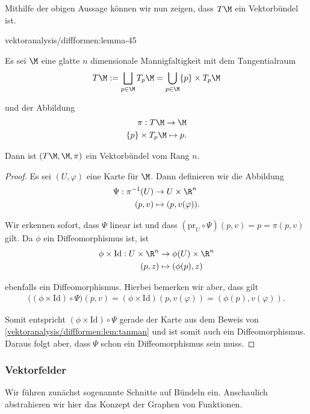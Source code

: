 \documentclass[letterpaper,10pt,english]{jupyterBook}
\begin{document}
\par
Mithilfe der obigen Aussage können wir nun zeigen, dass \(T\M\) ein Vektorbündel ist.
\begin{lemma}{}{vektoranalysis/diffformen:lemma-45}



\par
Es sei \(\M\) eine glatte \(n\) dimensionale Mannigfaltigkeit mit dem Tangentialraum
\begin{align*}
T\M:= \bigsqcup_{p\in\M}  T_p\M = \bigcup_{p\in\M} \{p\} \times T_p\M
\end{align*}
\par
und der Abbildung
\begin{align*}
\pi:T\M\to \M\\
\{p\}\times T_p\M\mapsto p.
\end{align*}
\par
Dann ist \((T\M, \M, \pi)\) ein Vektorbündel vom Rang \(n\).
\end{lemma}

\begin{proof}
 Es sei \((U,\varphi)\) eine Karte für \(\M\).
Dann definieren wir die Abbildung
\begin{align*}
\Psi: \pi^{-1}(U) &\to U\times \R^n\\
(p,v) &\mapsto (p, v(\varphi)).
\end{align*}
\par
Wir erkennen sofort, dass \(\Psi\) linear ist und dass \((\text{pr}_U\circ\Psi)(p,v) = p = \pi(p,v)\) gilt.
Da \(\phi\) ein Diffeomorphismus ist, ist
\begin{align*}
\phi\times\text{Id}:U\times \R^n &\to \phi(U)\times\R^n\\
(p,z) &\mapsto (\phi(p), z)
\end{align*}
\par
ebenfalls ein Diffeomorphismus.
Hierbei bemerken wir aber, dass gilt
\begin{align*}
\big((\phi\times\text{Id})\circ \Psi\big)(p,v) = (\phi\times\text{Id})(p, v(\varphi)) = (\phi(p), v(\varphi)).
\end{align*}
\par
Somit entspricht \((\phi\times\text{Id})\circ \Psi\) gerade der Karte aus dem Beweis von \cref{vektoranalysis/diffformen:lem:tanman} und ist somit auch ein Diffeomorphismus.
Daraus folgt aber, dass \(\Psi\) schon ein Diffeomorphismus sein muss.
\end{proof}


\subsubsection{Vektorfelder}
\label{\detokenize{vektoranalysis/diffformen:vektorfelder}}
\par
Wir führen zunächst sogenannte Schnitte auf Bündeln ein. Anschaulich abstrahieren wir hier das Konzept der Graphen von Funktionen.
\end{document}
